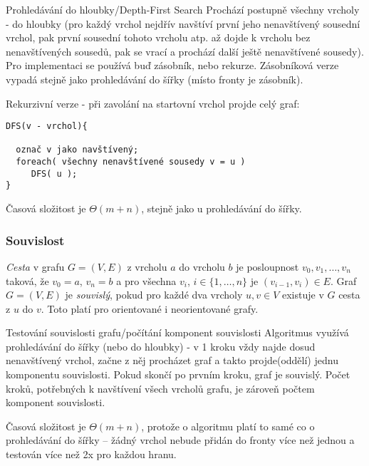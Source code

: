 \begin{algoritmusN}{Prohledávání do hloubky/Depth-First Search}
Prochází postupně všechny vrcholy - do hloubky (pro každý vrchol nejdřív navštíví první jeho nenavštívený    sousední vrchol, pak první sousední tohoto vrcholu atp. až dojde k vrcholu bez nenavštívených sousedů, pak se vrací a prochází další ještě nenavštívené sousedy). Pro implementaci se používá buď zásobník, nebo rekurze. Zásobníková verze vypadá stejně jako prohledávání do šířky (místo fronty je zásobník).

Rekurzivní verze - při zavolání na startovní vrchol projde celý graf:
\begin{verbatim}
DFS(v - vrchol){

  označ v jako navštívený;
  foreach( všechny nenavštívené sousedy v = u )
     DFS( u );
}
\end{verbatim}

Časová složitost je $\Theta(m+n)$, stejně jako u prohledávání do šířky.
\end{algoritmusN}


\subsubsection*{Souvislost}

\begin{definice}
\emph{Cesta} v grafu $G=(V,E)$ z vrcholu $a$ do vrcholu $b$ je posloupnost $v_0,v_1,\dots,v_n$ taková, že $v_0=a$, $v_n=b$ a pro všechna $v_i$, $i\in\{1,\dots,n\}$ je $(v_{i-1},v_i)\in E$. Graf $G=(V,E)$ je \emph{souvislý}, pokud pro každé dva vrcholy $u,v\in V$ existuje v $G$ cesta z $u$ do $v$. Toto platí pro orientované i neorientované grafy.
\end{definice}

\begin{algoritmusN}{Testování souvislosti grafu/počítání komponent souvislosti}
Algoritmus využívá prohledávání do šířky (nebo do hloubky) - v 1 kroku vždy najde dosud nenavštívený vrchol, začne z něj procházet graf a takto projde(oddělí) jednu komponentu souvislosti. Pokud skončí po prvním kroku, graf je souvislý. Počet kroků, potřebných k navštívení všech vrcholů grafu, je zároveň počtem komponent souvislosti.

Časová složitost je $\Theta(m+n)$, protože o algoritmu platí to samé co o prohledávání do šířky -- žádný vrchol nebude přidán do fronty více než jednou a testován více než 2x pro každou hranu.
\end{algoritmusN}


